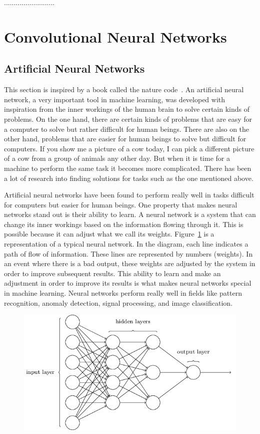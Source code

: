\documentclass[12pt, a4paper,oneside]{report}
\begin{document}
..........................

\section{Convolutional Neural Networks}

\subsection{Artificial Neural Networks}
This section is inspired by a book called the nature code~\cite{naturecode}. An artificial neural network, a very important tool in machine learning, was developed with inspiration from the inner workings of the human brain to solve certain kinds of problems. On the one hand, there are certain kinds of problems that are easy for a computer to solve but rather difficult for human beings. There are also on the other hand, problems that are easier for human beings to solve but difficult for computers. If you show me a picture of a cow today, I can pick a different picture of a cow from a group of animals any other day. But when it is time for a machine to perform the same task it becomes more complicated. There has been a lot of research into finding solutions for tasks such as the one mentioned above.

Artificial neural networks have been found to perform really well in tasks difficult for computers but easier for human beings. One property that makes neural networks stand out is their ability to learn. A neural network is a system that can change its inner workings based on the information flowing through it. This is possible because it can adjust what we call its weights.
Figure~\ref{fig:neural} is a representation of a typical neural network. In the diagram, each line indicates a path of flow of information. These lines are represented by numbers (weights). In an event where there is a bad output, these weights are adjusted by the system in order to improve subsequent results. This ability to learn and make an adjustment in order to improve its results is what makes neural networks special in machine learning. Neural networks perform really well in fields like pattern recognition, anomaly detection, signal processing, and image classification.

\begin{figure}[!htbp]
	\includegraphics [scale=0.7] {neural.png}
	\label{fig:neural}
\end{figure}
\end{document}
